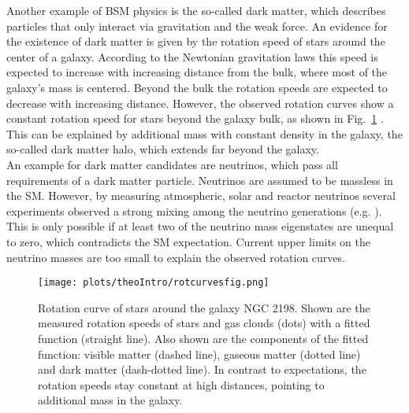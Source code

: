 \noindent Another example of BSM physics is the so-called dark matter, which describes particles that only interact via gravitation and the weak force. An evidence for the existence of dark matter is given by the rotation speed of stars around the center of a galaxy. According to the Newtonian gravitation laws this speed is expected to increase with increasing distance from the bulk, where most of the galaxy's mass is centered. Beyond the bulk the rotation speeds are expected to decrease with increasing distance. However, the observed rotation curves show a constant rotation speed for stars beyond the galaxy bulk, as shown in Fig.~\ref{fig:theo:rotcurves} \cite{rotcurves}. This can be explained by additional mass with constant density in the galaxy, the so-called dark matter halo, which extends far beyond the galaxy.\\ 
 
\noindent An example for dark matter candidates are neutrinos, which pass all requirements of a dark matter particle. Neutrinos are assumed to be massless in the SM. However, by measuring atmospheric, solar and reactor neutrinos several experiments observed a strong mixing among the neutrino generations (e.g. \cite{nuoszi1,nuoszi2,nuoszi3,nuoszi4}). This is only possible if at least two of the neutrino mass eigenstates are unequal to zero, which contradicts the SM expectation. Current upper limits on the neutrino masses are too small \cite{numasses1,numasses2} to explain the observed rotation curves.\\

\begin{figure}
	\centering
	\texttt{[image: plots/theoIntro/rotcurvesfig.png]}
	\caption[Rotation curve of stars around the galaxy NGC 2198]{Rotation curve of stars around the galaxy NGC 2198. Shown are the measured rotation speeds of stars and gas clouds (dots) with a fitted function (straight line). Also shown are the components of the fitted function: visible matter (dashed line), gaseous matter (dotted line) and dark matter (dash-dotted line). In contrast to expectations, the rotation speeds stay constant at high distances, pointing to additional mass in the galaxy.}
	\label{fig:theo:rotcurves}
\end{figure}

